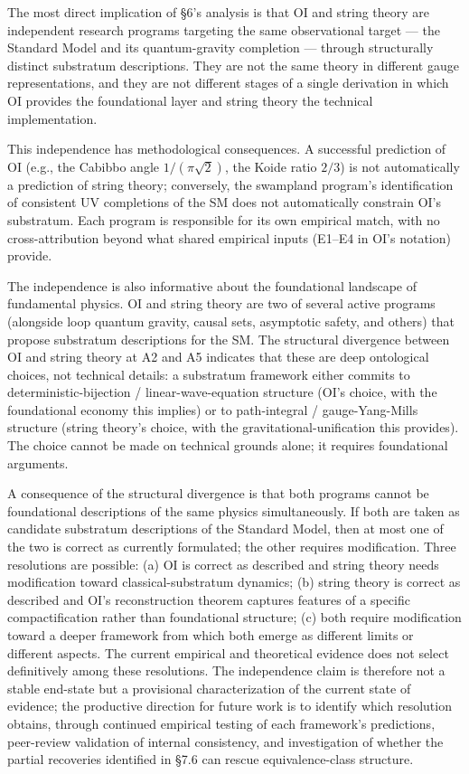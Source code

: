 \documentclass[
]{article}
\begin{document}
The most direct implication of §6's analysis is that OI and string
theory are independent research programs targeting the same
observational target --- the Standard Model and its quantum-gravity
completion --- through structurally distinct substratum descriptions.
They are not the same theory in different gauge representations, and
they are not different stages of a single derivation in which OI
provides the foundational layer and string theory the technical
implementation.

This independence has methodological consequences. A successful
prediction of OI (e.g., the Cabibbo angle \(1/(\pi\sqrt{2})\), the Koide
ratio \(2/3\)) is not automatically a prediction of string theory;
conversely, the swampland program's identification of consistent UV
completions of the SM does not automatically constrain OI's substratum.
Each program is responsible for its own empirical match, with no
cross-attribution beyond what shared empirical inputs (E1--E4 in OI's
notation) provide.

The independence is also informative about the foundational landscape of
fundamental physics. OI and string theory are two of several active
programs (alongside loop quantum gravity, causal sets, asymptotic
safety, and others) that propose substratum descriptions for the SM. The
structural divergence between OI and string theory at A2 and A5
indicates that these are deep ontological choices, not technical
details: a substratum framework either commits to
deterministic-bijection / linear-wave-equation structure (OI's choice,
with the foundational economy this implies) or to path-integral /
gauge-Yang-Mills structure (string theory's choice, with the
gravitational-unification this provides). The choice cannot be made on
technical grounds alone; it requires foundational arguments.

A consequence of the structural divergence is that both programs cannot
be foundational descriptions of the same physics simultaneously. If both
are taken as candidate substratum descriptions of the Standard Model,
then at most one of the two is correct as currently formulated; the
other requires modification. Three resolutions are possible: (a) OI is
correct as described and string theory needs modification toward
classical-substratum dynamics; (b) string theory is correct as described
and OI's reconstruction theorem captures features of a specific
compactification rather than foundational structure; (c) both require
modification toward a deeper framework from which both emerge as
different limits or different aspects. The current empirical and
theoretical evidence does not select definitively among these
resolutions. The independence claim is therefore not a stable end-state
but a provisional characterization of the current state of evidence; the
productive direction for future work is to identify which resolution
obtains, through continued empirical testing of each framework's
predictions, peer-review validation of internal consistency, and
investigation of whether the partial recoveries identified in §7.6 can
rescue equivalence-class structure.
\end{document}
